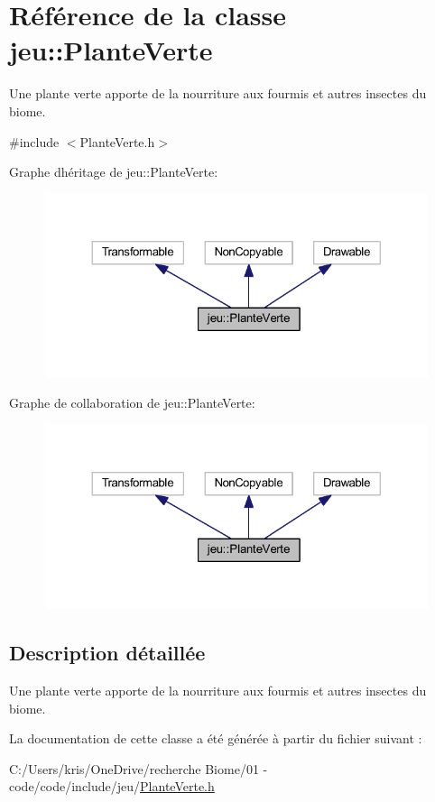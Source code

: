 \hypertarget{classjeu_1_1_plante_verte}{}\section{Référence de la classe jeu\+:\+:Plante\+Verte}
\label{classjeu_1_1_plante_verte}


Une plante verte apporte de la nourriture aux fourmis et autres insectes du biome.  




{\ttfamily \#include $<$Plante\+Verte.\+h$>$}



Graphe d\textquotesingle{}héritage de jeu\+:\+:Plante\+Verte\+:\nopagebreak
\begin{figure}[H]
\begin{center}
\leavevmode
\includegraphics[width=324pt]{classjeu_1_1_plante_verte__inherit__graph}
\end{center}
\end{figure}


Graphe de collaboration de jeu\+:\+:Plante\+Verte\+:\nopagebreak
\begin{figure}[H]
\begin{center}
\leavevmode
\includegraphics[width=324pt]{classjeu_1_1_plante_verte__coll__graph}
\end{center}
\end{figure}


\subsection{Description détaillée}
Une plante verte apporte de la nourriture aux fourmis et autres insectes du biome. 

La documentation de cette classe a été générée à partir du fichier suivant \+:\begin{DoxyCompactItemize}
\item 
C\+:/\+Users/kris/\+One\+Drive/recherche Biome/01 -\/ code/code/include/jeu/\hyperlink{_plante_verte_8h}{Plante\+Verte.\+h}\end{DoxyCompactItemize}
